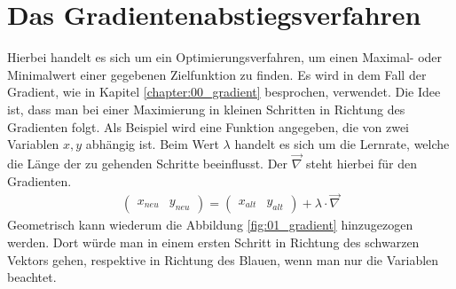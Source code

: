\section{Das Gradientenabstiegsverfahren}
Hierbei handelt es sich um ein Optimierungsverfahren, um einen Maximal- oder Minimalwert einer gegebenen Zielfunktion
zu finden. Es wird in dem Fall der Gradient, wie in Kapitel \ref{chapter:00_gradient} besprochen, verwendet. Die Idee
ist, dass man bei einer Maximierung in kleinen Schritten in Richtung des Gradienten folgt. Als Beispiel wird eine
Funktion angegeben, die von zwei Variablen $x, y$ abhängig ist. Beim Wert $\lambda$ handelt es sich um die Lernrate, welche
die Länge der zu gehenden Schritte beeinflusst. Der $\vec{\nabla}$ steht hierbei für den Gradienten.
\begin{align}
    \begin{pmatrix}x_{neu} & y_{neu}\end{pmatrix} = \begin{pmatrix}x_{alt} & y_{alt}\end{pmatrix} + \lambda \cdot \vec{\nabla}
\end{align}
Geometrisch kann wiederum die Abbildung \ref{fig:01_gradient} hinzugezogen werden. Dort würde man in einem ersten Schritt
in Richtung des schwarzen Vektors gehen, respektive in Richtung des Blauen, wenn man nur die Variablen beachtet.